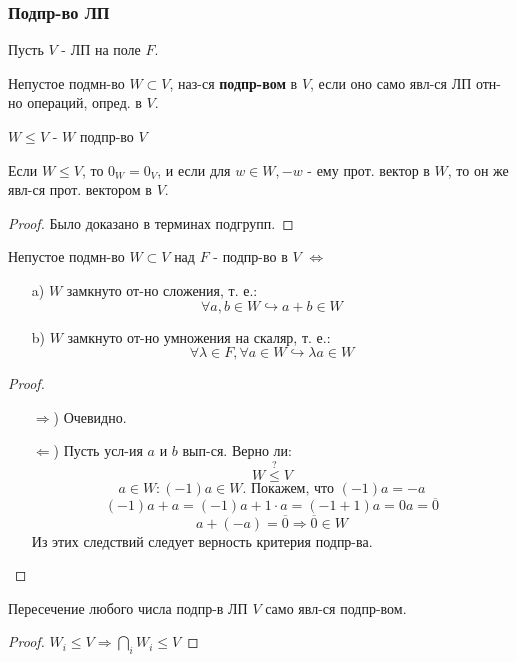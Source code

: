 \subsubsection{Подпр-во ЛП}
Пусть $V$ - ЛП на поле $F$.
\begin{definition}
Непустое подмн-во $W \subset V$, наз-ся \textbf{подпр-вом} в $V$, если оно само явл-ся ЛП отн-но операций, опред. в $V$.
\end{definition}
\begin{symb}
$W \leq V$ - $W$ подпр-во $V$
\end{symb}
\begin{statement}
Если $W \leq V$, то $0_W = 0_V$, и если для $w \in W, -w $ - ему прот. вектор в $W$, то он же явл-ся прот. вектором в $V$.
\end{statement}
\begin{proof}
Было доказано в терминах подгрупп.
\end{proof}
\begin{statement}
Непустое подмн-во $W \subset V$ над $F$ - подпр-во в $V$ $\iff$
\begin{itemize}
  \item [a) ] $W$ замкнуто от-но сложения, т. е.:
    \[
    \forall a, b \in W \hookrightarrow a + b \in W
    \]
  \item [b) ] $W$ замкнуто от-но умножения на скаляр, т. е.:
    \[
    \forall \lambda \in F, \forall a \in W \hookrightarrow \lambda a \in W
    \]
\end{itemize}
\end{statement}
\begin{proof}
\begin{itemize}
  \item [$\Rightarrow$)] Очевидно.
  \item [$\Leftarrow$)] Пусть усл-ия $a$ и $b$ вып-ся. Верно ли:
\[
  W \overset{?}{\leq} V
\]
\[
  a \in W \colon (-1)a \in W. \text{ Покажем, что $(-1)a = -a$}
\] 
\[
  (-1)a + a = (-1)a + 1 \cdot a = (-1 + 1) a = 0 a = \overline{0}
\]
\[
  a + (-a) = \overline{0} \Rightarrow \overline{0} \in W
\]
Из этих следствий следует верность критерия подпр-ва.
\end{itemize}
\end{proof}
\begin{consequence}
Пересечение любого числа подпр-в ЛП $V$ само явл-ся подпр-вом.
\end{consequence}
\begin{proof}
$W_i \leq V \Rightarrow \bigcap_{i}^{} W_i \leq V$
\end{proof}

